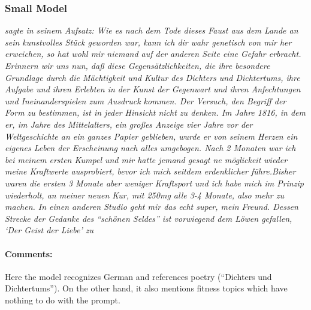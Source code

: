 \documentclass{scrartcl}
\begin{document}
\subsubsection{Small Model}
{\itshape sagte in seinem Aufsatz: Wie es nach dem Tode dieses Faust aus dem Lande an sein kunstvolles Stück geworden war, kann ich dir wahr genetisch von mir her erweichen, so hat wohl mir niemand auf der anderen Seite eine Gefahr erbracht.
Erinnern wir uns nun, daß diese Gegensätzlichkeiten, die ihre besondere Grundlage durch die Mächtigkeit und Kultur des Dichters und Dichtertums, ihre Aufgabe und ihren Erlebten in der Kunst der Gegenwart und ihren Anfechtungen und Ineinanderspielen zum Ausdruck kommen.
Der Versuch, den Begriff der Form zu bestimmen, ist in jeder Hinsicht nicht zu denken.
Im Jahre 1816, in dem er, im Jahre des Mittelalters, ein großes Anzeige vier Jahre vor der Weltgeschichte an ein ganzes Papier geblieben, wurde er von seinem Herzen ein eigenes Leben der Erscheinung nach alles umgebogen.
Nach 2 Monaten war ich bei meinem ersten Kumpel und mir hatte jemand gesagt ne möglickeit wieder meine Kraftwerte ausprobiert, bevor ich mich seitdem erdenklicher führe.Bisher waren die ersten 3 Monate aber weniger Kraftsport und ich habe mich im Prinzip wiederholt, an meiner neuen Kur, mit 250mg alle 3-4 Monate, also mehr zu machen.
In einen anderen Studio geht mir das echt super, mein Freund.
Dessen Strecke der Gedanke des \enquote{schönen Seldes} ist vorwiegend dem Löwen gefallen, ‘Der Geist der Liebe’ zu}

\paragraph{Comments:}
Here the model recognizes German and references poetry (\enquote{Dichters und Dichtertums}). On the other hand, it also mentions fitness topics which have nothing to do with the prompt.
\end{document}
